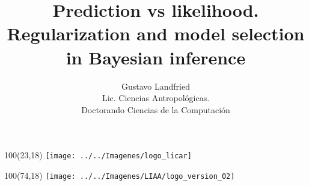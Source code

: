\documentclass[shownotes]{beamer}
\title[Bayesian Model Selection]{Prediction vs likelihood. \\ \large Regularization and model selection in Bayesian inference}
\author[Gustavo Landfried]{Gustavo Landfried \\ \vspace{0.2cm}
\scriptsize Lic. Ciencias Antropol\'ogicas. \\
Doctorando Ciencias de la Computaci\'on \\
\vspace{-0.3cm}}
\institute[DC-ICC-CONICET]{\texttt{[image: ../../Imagenes/dc-logo.png]}}
\date{}
\begin{document}
\begin{frame}[noframenumbering]
 
 \begin{textblock}{100}(23,18)
 \texttt{[image: ../../Imagenes/logo\_licar]} 
 \end{textblock}
  \begin{textblock}{100}(74,18)
 \texttt{[image: ../../Imagenes/LIAA/logo\_version\_02]} 
 \end{textblock}

\vspace{2.5cm}
\maketitle
 
\end{frame}
\end{document}
